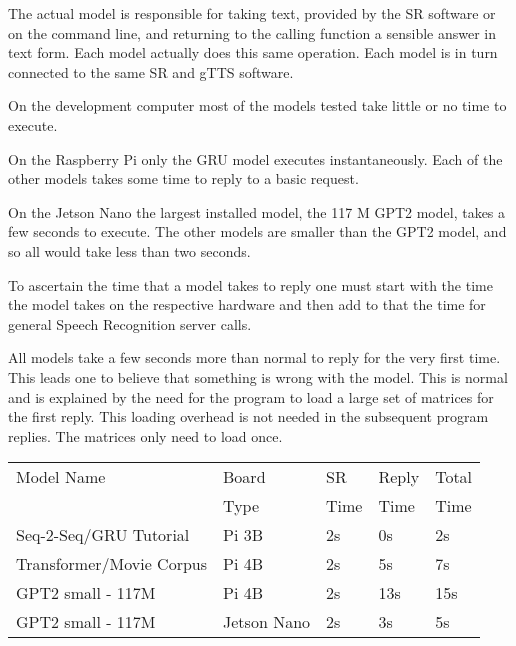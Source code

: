 The actual model is responsible for taking text, provided by the SR software or on the command line, and returning to the calling function a sensible answer in text form. Each model actually does this same operation. Each model is in turn connected to the same SR and gTTS software.

On the development computer most of the models tested take little or no time to execute.

On the Raspberry Pi only the GRU model executes instantaneously. Each of the other models takes some time to reply to a basic request.

On the Jetson Nano the largest installed model, the 117 M GPT2 model, takes a few seconds to execute. The other models are smaller than the GPT2 model, and so all would take less than two seconds.

To ascertain the time that a model takes to reply one must start with the time the model takes on the respective hardware and then add to that the time for general Speech Recognition server calls.

All models take a few seconds more than normal to reply for the very first time. This leads one to believe that something is wrong with the model. This is normal and is explained by the need for the program to load a large set of matrices for the first reply. This loading overhead is not needed in the subsequent program replies. The matrices only need to load once.

\label{setup-reply-time}

\begin{table}[H]
	
	\begin{center}
		
		
		\begin{tabular}{lllll}
			
			Model Name    & Board  & SR  & Reply    & Total  \\
			&  Type & Time  & Time    & Time  \\
			\hline
			\hline
			Seq-2-Seq/GRU Tutorial & Pi 3B     & 2s & 0s             & 2s   \\
			Transformer/Movie Corpus & Pi 4B      & 2s & 5s  & 7s      \\
			GPT2 small - 117M   & Pi 4B     & 2s   & 13s         & 15s      \\
			GPT2 small - 117M   & Jetson Nano & 2s   & 3s         & 5s      \\
			\hline
		\end{tabular}
		
		\bigskip
	\end{center}
	
	
	\label{fig:time-compare}
\end{table}


